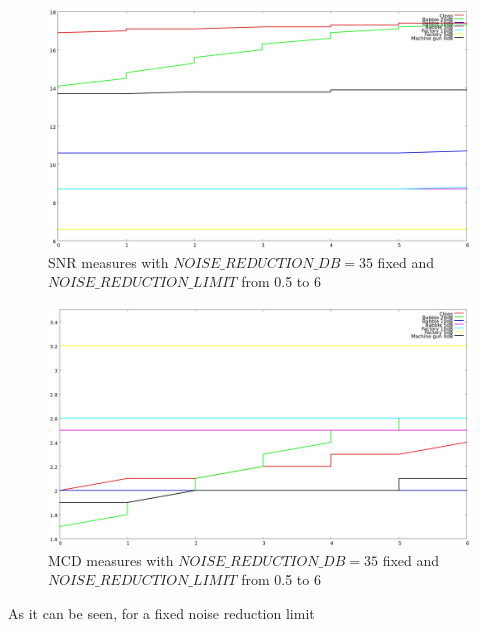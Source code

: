 \begin{figure}[!htb]
\begin{centering}
\includegraphics[width=\textwidth]{images/noise_red_lim_snr_exp.jpg}
\caption{SNR measures with $NOISE\_REDUCTION\_DB = 35$ fixed and $NOISE\_REDUCTION\_LIMIT$ from 0.5 to 6}
\label{fig:noise_red_lim_snr}
\end{centering}
\end{figure}

\begin{figure}[!htb]
\begin{centering}
\includegraphics[width=\textwidth]{images/noise_red_lim_mcd_exp.jpg}
\caption{MCD measures with $NOISE\_REDUCTION\_DB = 35$ fixed and $NOISE\_REDUCTION\_LIMIT$ from 0.5 to 6}
\label{fig:noise_red_lim_mcd}
\end{centering}
\end{figure}

As it can be seen, for a fixed noise reduction limit 